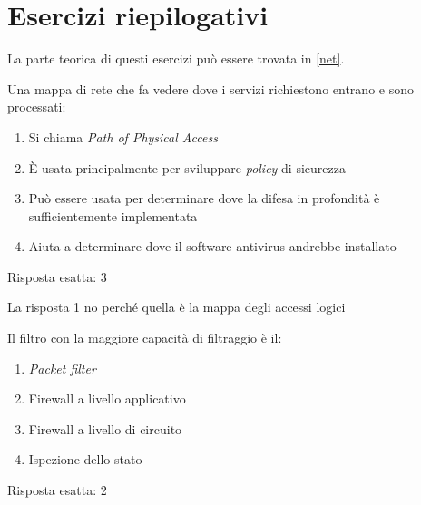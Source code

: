 \section{Esercizi riepilogativi}
\label{EsNetRiep}

La parte teorica di questi esercizi pu\`o essere trovata in \ref{net}.

\begin{Exercise} [
  title={Quiz},
  label={netriep1}
  ]

  \Question Una mappa di rete che fa vedere dove i servizi richiestono entrano
e sono processati:

\begin{enumerate}
 \item Si chiama \textit{Path of Physical Access}
 \item \`E usata principalmente per sviluppare \textit{policy} di sicurezza
 \item Pu\`o essere usata per determinare dove la difesa in profondit\`a \`e
sufficientemente implementata
 \item Aiuta a determinare dove il software antivirus andrebbe installato
\end{enumerate}

\end{Exercise}


\begin{Answer} [
  ref={netriep1},
  number={1}
  ]

  \Question Risposta esatta: 3

  La risposta 1 no perché quella è la mappa degli accessi logici

\end{Answer}



\begin{Exercise} [
  title={Quiz},
  label={netriep2}
  ]

  \Question Il filtro con la maggiore capacit\`a di filtraggio \`e il:
\begin{enumerate}
 \item \textit{Packet filter}
 \item Firewall a livello applicativo
 \item Firewall a livello di circuito
 \item Ispezione dello stato
\end{enumerate}

\end{Exercise}


\begin{Answer} [
  ref={netriep2},
  number={2}
  ]

  \Question Risposta esatta: 2

\end{Answer}

